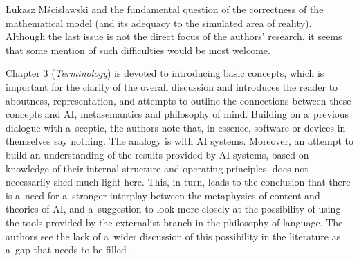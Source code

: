 \begin{newrevengenv}{Łukasz Mścisławski}
\parencite[e.g.][]{spence_stoic_2021} %
 and the fundamental question of the correctness of the mathematical model (and its adequacy to the simulated area of reality). Although the last issue is not the direct focus of the authors' research, it seems that some mention of such difficulties would be most welcome.

Chapter 3 (\textit{Terminology}) is devoted to introducing basic concepts, which is important for the clarity of the overall discussion and introduces the reader to aboutness, representation, and attempts to outline the connections between these concepts and AI, metasemantics and philosophy of mind. Building on a~previous dialogue with a~sceptic, the authors note that, in essence, software or devices in themselves say nothing. The analogy is with AI systems. Moreover, an attempt to build an understanding of the results provided by AI systems, based on knowledge of their internal structure and operating principles, does not necessarily shed much light here. This, in turn, leads to the conclusion that there is a~need for a~stronger interplay between the metaphysics of content and theories of AI, and a~suggestion to look more closely at the possibility of using the tools provided by the externalist branch in the philosophy of language. The authors see the lack of a~wider discussion of this possibility in the literature as a~gap that needs to be filled
\parencite[pp.53-58; cf.][]{krzanowski_meta-ontology_2022}.%



\end{newrevengenv}
